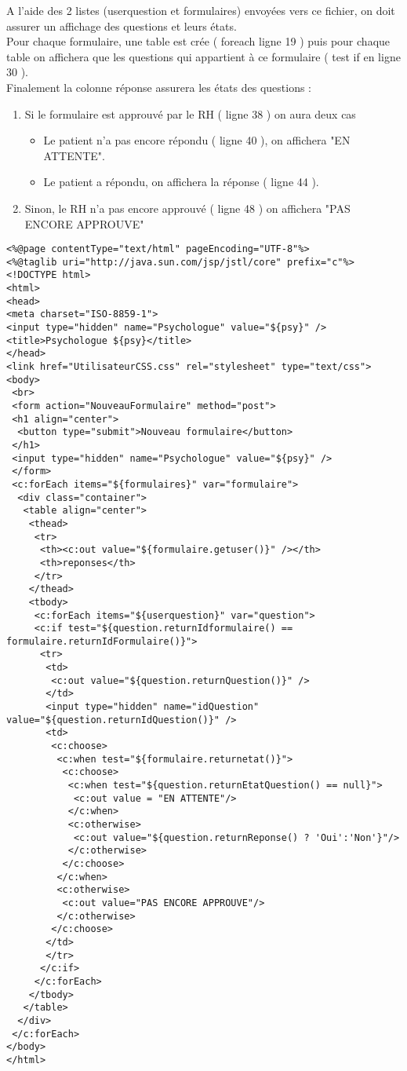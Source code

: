 \documentclass[12]{article}
\begin{document}
A l'aide des 2 listes (userquestion et formulaires) envoyées vers ce fichier, on doit assurer un affichage des questions et leurs états.\\

Pour chaque formulaire, une table est crée ( foreach ligne 19 )  puis pour chaque table on affichera que les questions qui appartient à ce formulaire ( test if en ligne 30 ).\\

Finalement la colonne réponse assurera les états des questions :
\begin{enumerate}
\item Si le formulaire est approuvé par le RH ( ligne 38 ) on aura deux cas
\begin{itemize}
\item Le patient n'a pas encore répondu ( ligne 40 ), on affichera "EN ATTENTE".
\item Le patient a répondu, on affichera la réponse ( ligne 44 ).
\end{itemize} 
\item Sinon, le RH n'a pas encore approuvé ( ligne 48 ) on affichera "PAS ENCORE APPROUVE"
\end{enumerate}


\newpage




\begin{footnotesize}
\lstset{language=XML}
\begin{lstlisting}
<%@page contentType="text/html" pageEncoding="UTF-8"%>
<%@taglib uri="http://java.sun.com/jsp/jstl/core" prefix="c"%>
<!DOCTYPE html>
<html>
<head>
<meta charset="ISO-8859-1">
<input type="hidden" name="Psychologue" value="${psy}" />
<title>Psychologue ${psy}</title>
</head>
<link href="UtilisateurCSS.css" rel="stylesheet" type="text/css">
<body>
 <br>
 <form action="NouveauFormulaire" method="post">
 <h1 align="center">
  <button type="submit">Nouveau formulaire</button>
 </h1>
 <input type="hidden" name="Psychologue" value="${psy}" />
 </form>
 <c:forEach items="${formulaires}" var="formulaire">
  <div class="container">
   <table align="center">
    <thead>
     <tr>
      <th><c:out value="${formulaire.getuser()}" /></th>
      <th>reponses</th>
     </tr>
    </thead>
    <tbody>
     <c:forEach items="${userquestion}" var="question">
     <c:if test="${question.returnIdformulaire() == formulaire.returnIdFormulaire()}">
      <tr>
       <td>
        <c:out value="${question.returnQuestion()}" />
       </td>
       <input type="hidden" name="idQuestion" value="${question.returnIdQuestion()}" />
       <td>
        <c:choose>	
         <c:when test="${formulaire.returnetat()}">
          <c:choose>
		   <c:when test="${question.returnEtatQuestion() == null}">
			<c:out value = "EN ATTENTE"/>
		   </c:when>
		   <c:otherwise>
			<c:out value="${question.returnReponse() ? 'Oui':'Non'}"/>
		   </c:otherwise>
		  </c:choose>
		 </c:when>
   		 <c:otherwise>
		  <c:out value="PAS ENCORE APPROUVE"/>
		 </c:otherwise>
		</c:choose>
	   </td>
	   </tr>
	  </c:if>
	 </c:forEach>
	</tbody>
   </table>
  </div>
 </c:forEach>
</body>
</html>
\end{lstlisting}
\end{footnotesize}
\end{document}
